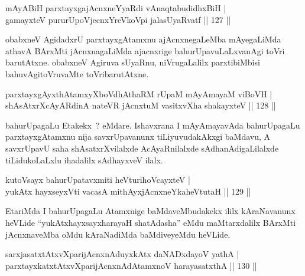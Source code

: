 
\begin{shl}
mAyABiH parxtayxgajAcnxneYyaRdi vA\s naqtabudidhxBiH |\\
gamayxteV pururUpoV\s jecnxYreVkoV\s pi jalasUyaRvatf \hfill || 127 ||
\end{shl}

\begin{artha}
obabxneV AgidadxrU parxtayxgAtamxnu ajAcnxnegaLeMba mAyegaLiMda athavA BArxMti jAcnxnagaLiMda ajacnxrige bahurUpavuLaLxvanAgi toVri barutAtxne. obabxneV Agiruva sUyaRnu, niVrugaLalilx  parxtibiMbisi bahuvAgitoVruvaMte toVribarutAtxne.
\end{artha}

\begin{shl}
parxtayxgAyxthAtamxyXboVdhAthaRM rUpaM mAyAmayaM viBoVH |\\
shAsAtxrXcAyARdinA nateVR jAcnxtuM vasitxvXha shakayxteV \hfill || 128 ||
\end{shl}	

\begin{artha}
bahurUpagaLu Etakekx~? eMdare. Ishavxrana I mAyAmayavAda bahurUpagaLu parxtayxgAtamxnu nija savxrUpavanunx tiLiyuvudakAkxgi baMdavu, A savxrUpavU saha shAsatxrXvilalxde AcAyaRnilalxde sAdhanAdigaLilalxde tiLidukoLaLxlu ihadalilx sAdhayxveV ilalx.
\end{artha}


\begin{shl}
kutoV\s sayx bahurUpatavxmiti heVturihoVcayxteV |\\
yukAtx hayxseyxVti vacasA mithAyxjAcnxneYkaheVtutaH \hfill || 129 ||
\end{shl}

\begin{artha}
EtariMda I bahurUpagaLu Atamxnige baMdaveMbudakekx ililx kAraNavanunx heVLide ``yukAtxhayxsayxharayaH shatAdasha'' eMdu maMtarxdalilx BArxMti jAcnxnaveMba oMdu kAraNadiMda baMdiveyeMdu heVLide.
\end{artha}

\begin{shl}
sarxjasatxtAtxvXparijAcnxnAduyxkAtx daNADxdayoV yathA |\\
parxtayxkatxtAtxvXparijAcnxnAdAtamxnoV harayasatxthA \hfill || 130 ||
\end{shl}

